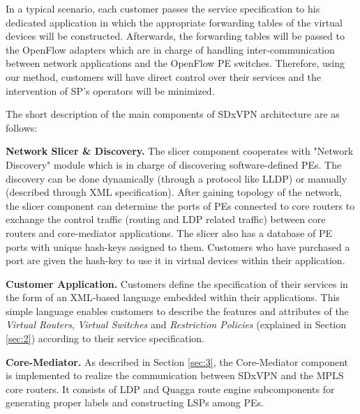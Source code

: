 \documentclass[10pt,conference]{IEEEtran}
\begin{document}
In a typical scenario, each customer passes the service specification to his dedicated application in which
the appropriate forwarding tables of the virtual devices will be constructed.
Afterwards, the forwarding tables will be  passed to the OpenFlow adapters which are in charge of handling inter-communication between network applications and the OpenFlow PE switches.
Therefore, using our method, customers
will have direct control over their services and the intervention of SP's operators will be minimized.

The short description of the main components of SDxVPN architecture are as follows:




\textbf {Network Slicer \& Discovery.} The slicer component cooperates with "Network Discovery" module which is in charge of discovering software-defined PEs. The discovery can be done dynamically (through a protocol like LLDP) or manually (described through XML specification). After gaining topology of the network, the slicer component can determine the ports of PEs connected to core routers to exchange the control traffic (routing and LDP related traffic) between core routers and core-mediator applications.
The slicer also has a database of PE ports with unique hash-keys assigned to them. Customers who have purchased a port are given the hash-key to use it in virtual devices within their application.


\textbf {Customer Application.}
Customers define the specification of their services in the form of an XML-based language embedded within their applications. 
This simple language enables customers to describe the features and attributes of the \textit{Virtual Routers}, \textit{Virtual Switches} and \textit{Restriction Policies} (explained in Section \ref{sec:2}) according to  their service specification. 

\textbf {Core-Mediator.}
As described in Section \ref{sec:3}, the Core-Mediator component is implemented to realize the communication between SDxVPN and the MPLS core routers. It consists of LDP and Quagga route engine subcomponents for generating proper labels and constructing LSPs among PEs.  
\end{document}
